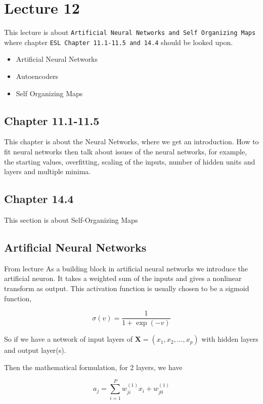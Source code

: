 \chapter{Lecture 12}

This lecture is about \texttt{Artificial Neural Networks and Self Organizing Maps} where chapter \texttt{ESL Chapter 11.1-11.5
and 14.4} should be looked upon.

\begin{itemize}
  \item Artificial Neural Networks
  \item Autoencoders
  \item Self Organizing Maps
\end{itemize}

\section{Chapter 11.1-11.5}

This chapter is about the Neural Networks, where we get an introduction. How to fit neural networks then talk about issues of the neural networks, for example, the starting values, overfitting, scaling of the inputs, number of hidden units and layers and multiple minima.


\section{Chapter 14.4}

This section is about Self-Organizing Maps

\section{Artificial Neural Networks}

From lecture \cite[p.~6]{lecture12} As a building block in artificial neural networks we introduce the artificial neuron. It takes a weighted sum of the inputs and gives a nonlinear transform as output. This activation function is usually chosen to be a sigmoid function,

\[
    \sigma(v) = \frac{1}{1 + \exp(-v)}
\]

So if we have a network of input layers of $\bm{X} = (x_1, x_2, ... , x_p)$ with hidden layers and output layer(s).

Then the mathematical formulation, for 2 layers, we have

\[
    a_j = \sum_{i = 1}^{P} w_{ji}^{(1)} x_i + w_{j0}^{(1)}
\]

